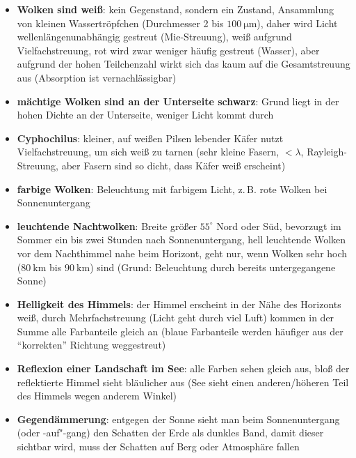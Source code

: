 \linie
\begin{itemize}
    \item
    \textbf{Wolken sind weiß}:
    kein Gegenstand, sondern ein Zustand, Ansammlung von kleinen
    Wassertröpfchen (Durchmesser 2 bis $\SI{100}{\micro\meter}$), daher
    wird Licht wellenlängenunabhängig gestreut (Mie-Streuung),
    weiß aufgrund Vielfachstreuung, rot wird zwar weniger häufig gestreut
    (Wasser), aber aufgrund der hohen Teilchenzahl wirkt sich das kaum auf
    die Gesamtstreuung aus (Absorption ist vernachlässigbar)

    \item
    \textbf{mächtige Wolken sind an der Unterseite schwarz}:
    Grund liegt in der hohen Dichte an der Unterseite, weniger Licht kommt
    durch

    \item
    \textbf{Cyphochilus}:
    kleiner, auf weißen Pilsen lebender Käfer nutzt Vielfachstreuung, um sich
    weiß zu tarnen (sehr kleine Fasern, $< \lambda$, Rayleigh-Streuung, aber
    Fasern sind so dicht, dass Käfer weiß erscheint)

    \item
    \textbf{farbige Wolken}:
    Beleuchtung mit farbigem Licht, z.\,B. rote Wolken bei Sonnenuntergang

    \item
    \textbf{leuchtende Nachtwolken}:
    Breite größer $55^\circ$ Nord oder Süd, bevorzugt im Sommer
    ein bis zwei Stunden nach Sonnenuntergang,
    hell leuchtende Wolken vor dem Nachthimmel nahe beim Horizont,
    geht nur, wenn Wolken sehr hoch ($\SI{80}{\kilo\meter}$ bis $\SI{90}{\kilo\meter}$) sind
    (Grund: Beleuchtung durch bereits untergegangene Sonne)

    \item
    \textbf{Helligkeit des Himmels}:
    der Himmel erscheint in der Nähe des Horizonts weiß,
    durch Mehrfachstreuung (Licht geht durch viel Luft) kommen in der Summe
    alle Farbanteile gleich an (blaue Farbanteile werden häufiger aus der
    "`korrekten"' Richtung weggestreut)

    \item
    \textbf{Reflexion einer Landschaft im See}:
    alle Farben sehen gleich aus,
    bloß der reflektierte Himmel sieht bläulicher aus
    (See sieht einen anderen/höheren Teil des Himmels wegen anderem Winkel)

    \item
    \textbf{Gegendämmerung}:
    entgegen der Sonne sieht man beim Sonnenuntergang (oder -auf"-gang)
    den Schatten der Erde als dunkles Band,
    damit dieser sichtbar wird, muss der Schatten auf Berg oder Atmosphäre
    fallen


\end{itemize}
